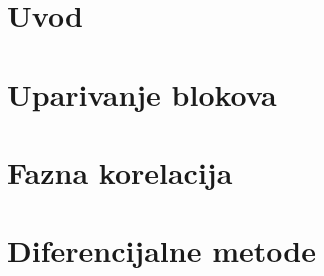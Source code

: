 \section{Uvod}


\section{Uparivanje blokova}


\section{Fazna korelacija}
%

\section{Diferencijalne metode}
%